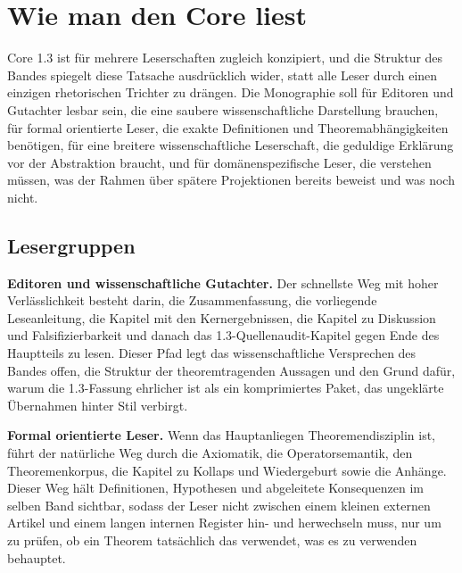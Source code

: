 \section{Wie man den Core liest}

Core 1.3 ist für mehrere Leserschaften zugleich konzipiert, und die Struktur des Bandes spiegelt
diese Tatsache ausdrücklich wider, statt alle Leser durch einen einzigen rhetorischen Trichter
zu drängen.
Die Monographie soll für Editoren und Gutachter lesbar sein, die eine saubere wissenschaftliche
Darstellung brauchen, für formal orientierte Leser, die exakte Definitionen und
Theoremabhängigkeiten benötigen, für eine breitere wissenschaftliche Leserschaft, die geduldige
Erklärung vor der Abstraktion braucht, und für domänenspezifische Leser, die verstehen müssen,
was der Rahmen über spätere Projektionen bereits beweist und was noch nicht.

\subsection{Lesergruppen}

\textbf{Editoren und wissenschaftliche Gutachter.}
Der schnellste Weg mit hoher Verlässlichkeit besteht darin, die Zusammenfassung, die vorliegende
Leseanleitung, die Kapitel mit den Kernergebnissen, die Kapitel zu Diskussion und
Falsifizierbarkeit und danach das 1.3-Quellenaudit-Kapitel gegen Ende des Hauptteils zu lesen.
Dieser Pfad legt das wissenschaftliche Versprechen des Bandes offen, die Struktur der
theoremtragenden Aussagen und den Grund dafür, warum die 1.3-Fassung ehrlicher ist als ein
komprimiertes Paket, das ungeklärte Übernahmen hinter Stil verbirgt.

\textbf{Formal orientierte Leser.}
Wenn das Hauptanliegen Theoremendisziplin ist, führt der natürliche Weg durch die Axiomatik, die
Operatorsemantik, den Theoremenkorpus, die Kapitel zu Kollaps und Wiedergeburt sowie die Anhänge.
Dieser Weg hält Definitionen, Hypothesen und abgeleitete Konsequenzen im selben Band sichtbar,
sodass der Leser nicht zwischen einem kleinen externen Artikel und einem langen internen Register
hin- und herwechseln muss, nur um zu prüfen, ob ein Theorem tatsächlich das verwendet, was es zu
verwenden behauptet.

